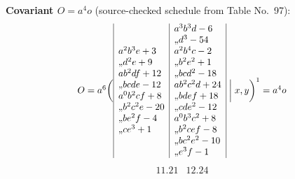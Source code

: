 \documentclass[11pt]{article}
\providecommand{\ditto}{\mathord{\hbox{,,}}}
\begin{document}
\medskip

\noindent\textbf{Covariant $O=a^{4}o$} (source-checked schedule from Table No.~97):
\[
\resizebox{0.62\textwidth}{!}{$
O=a^{6}\biggl(
\begin{array}{|l|l|}
\begin{array}{@{}l@{}}
a^{2}b^{3}e+3\\
\ditto d^{2}e+9\\
ab^{2}df+12\\
\ditto bcde-12\\
a^{0}b^{2}cf+8\\
\ditto b^{2}c^{2}e-20\\
\ditto be^{2}f-4\\
\ditto ce^{3}+1
\end{array}
&
\begin{array}{@{}l@{}}
a^{3}b^{3}d-6\\
\ditto d^{3}-54\\
a^{2}b^{4}c-2\\
\ditto b^{2}e^{2}+1\\
\ditto bcd^{2}-18\\
ab^{2}c^{2}d+24\\
\ditto bdef+18\\
\ditto cde^{2}-12\\
a^{0}b^{3}c^{2}+8\\
\ditto b^{2}cef-8\\
\ditto bc^{2}e^{2}-10\\
\ditto e^{3}f-1
\end{array}
\end{array}
\biggm|x,y\biggr)^{1}=a^{4}o
$}
\]
\[
\begin{array}{cc}
11.21 & 12.24
\end{array}
\]

\medskip
\end{document}
